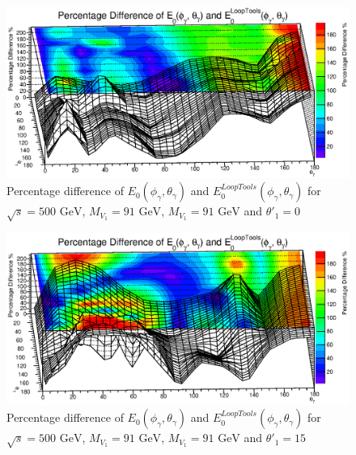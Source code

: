 \begin{figure}
	\begin{center}
		\includegraphics[scale=0.55]{0PD3.eps}
		\caption{ Percentage difference of $E_0(\phi_\gamma,\theta_\gamma)$ and $E_0^{LoopTools}(\phi_\gamma,\theta_\gamma)$ for $\sqrt{s}=500\text{ GeV}$, $M_{V_1}=91\text{ GeV}$, $M_{V_1}=91\text{ GeV}$ and $\theta'_1=0$ }
	\end{center}
\end{figure}

\begin{figure}
	\begin{center}
		\includegraphics[scale=0.55]{15PD3.eps}
	\caption{ Percentage difference of $E_0(\phi_\gamma,\theta_\gamma)$ and $E_0^{LoopTools}(\phi_\gamma,\theta_\gamma)$ for $\sqrt{s}=500\text{ GeV}$, $M_{V_1}=91\text{ GeV}$, $M_{V_1}=91\text{ GeV}$ and $\theta'_1=15$ }
	\end{center}
\end{figure}


